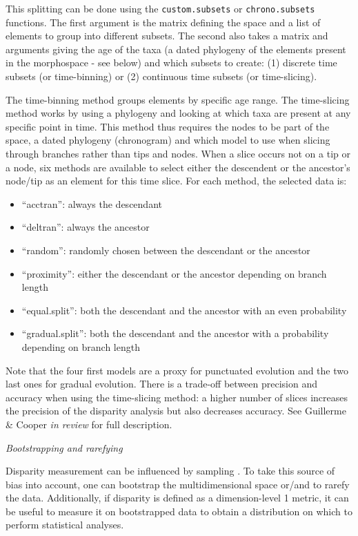 \documentclass[12pt,letterpaper]{article}
\renewcommand{\subsection}[1]{%
\bigskip
\begin{center}
\begin{large}
\normalfont\itshape #1
\end{large}
\end{center}}
\begin{document}
This splitting can be done using the \texttt{custom.subsets} or \texttt{chrono.subsets} functions.
The first argument is the matrix defining the space and a list of elements to group into different subsets.
The second also takes a matrix and arguments giving the age of the taxa (a dated phylogeny of the elements present in the morphospace - see below) and which subsets to create: (1) discrete time subsets (or time-binning) or (2) continuous time subsets (or time-slicing).

The time-binning method groups elements by specific age range.
The time-slicing method works by using a phylogeny and looking at which taxa are present at any specific point in time.
This method thus requires the nodes to be part of the space, a dated phylogeny (chronogram) and which model to use when slicing through branches rather than tips and nodes.
When a slice occurs not on a tip or a node, six methods are available to select either the descendent or the ancestor's node/tip as an element for this time slice.
For each method, the selected data is:

\begin{itemize}
    \item ``acctran'': always the descendant
    \item ``deltran'': always the ancestor
    \item ``random'': randomly chosen between the descendant or the ancestor
    \item ``proximity'': either the descendant or the ancestor depending on branch length
    \item ``equal.split'': both the descendant and the ancestor with an even probability
    \item ``gradual.split'': both the descendant and the ancestor with a probability depending on branch length
\end{itemize}

Note that the four first models are a proxy for punctuated evolution and the two last ones for gradual evolution.
There is a trade-off between precision and accuracy when using the time-slicing method: a higher number of slices increases the precision of the disparity analysis but also decreases accuracy.
See Guillerme \& Cooper \textit{in review} for full description.

\subsection{Bootstrapping and rarefying}
Disparity measurement can be influenced by sampling \citep{Butler2012}.
To take this source of bias into account, one can bootstrap the multidimensional space or/and to rarefy the data.
Additionally, if disparity is defined as a dimension-level 1 metric, it can be useful to measure it on bootstrapped data to obtain a distribution on which to perform statistical analyses.
\end{document}
